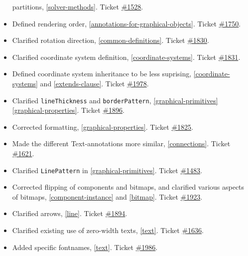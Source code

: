 \begin{itemize}
  partitions, \cref{solver-methods}. Ticket
  \href{https://github.com/modelica/ModelicaSpecification/issues/1528}{\#1528}.
\item
  Defined rendering order, \cref{annotations-for-graphical-objects}. Ticket
  \href{https://github.com/modelica/ModelicaSpecification/issues/1750}{\#1750}.
\item
  Clarified rotation direction, \cref{common-definitions}. Ticket
  \href{https://github.com/modelica/ModelicaSpecification/issues/1830}{\#1830}.
\item
  Clarified coordinate system definition, \cref{coordinate-systems}. Ticket
  \href{https://github.com/modelica/ModelicaSpecification/issues/1831}{\#1831}.
\item
  Defined coordinate system inheritance to be less suprising,
  \cref{coordinate-systems} and \cref{extends-clause}. Ticket
  \href{https://github.com/modelica/ModelicaSpecification/issues/1978}{\#1978}.
\item
  Clarified \lstinline!lineThickness! and \lstinline!borderPattern!, \cref{graphical-primitives} \cref{graphical-properties}.
  Ticket \href{https://github.com/modelica/ModelicaSpecification/issues/1896}{\#1896}.
\item
  Corrected formatting, \cref{graphical-properties}. Ticket
  \href{https://github.com/modelica/ModelicaSpecification/issues/1825}{\#1825}.
\item
  Made the different Text-annotations more similar, \cref{connections}.
  Ticket \href{https://github.com/modelica/ModelicaSpecification/issues/1621}{\#1621}.
\item
  Clarified \lstinline!LinePattern! in \cref{graphical-primitives}.
  Ticket \href{https://github.com/modelica/ModelicaSpecification/issues/1483}{\#1483}.
\item
  Corrected flipping of components and bitmaps, and clarified various
  aspects of bitmaps, \cref{component-instance} and \cref{bitmap}. Ticket
  \href{https://github.com/modelica/ModelicaSpecification/issues/1923}{\#1923}.
\item
  Clarified arrows, \cref{line}. Ticket
  \href{https://github.com/modelica/ModelicaSpecification/issues/1894}{\#1894}.
\item
  Clarified existing use of zero-width texts, \cref{text}. Ticket
  \href{https://github.com/modelica/ModelicaSpecification/issues/1636}{\#1636}.
\item
  Added specific fontnames, \cref{text}. Ticket
  \href{https://github.com/modelica/ModelicaSpecification/issues/1986}{\#1986}.

\end{itemize}
